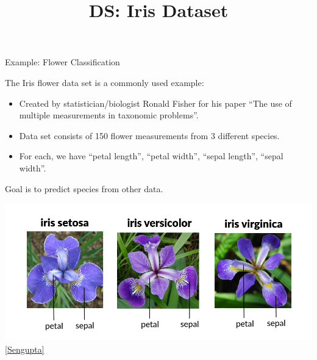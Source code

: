 \documentclass[aspectratio=169]{../latex_main/tntbeamer}  %
\title[Introduction]{DS: Iris Dataset}
\subtitle{}
\begin{document}
	
	\maketitle

	
	
	\begin{frame}{Example: Flower Classification}
	
	\vspace{-2em}
	    The Iris flower data set is a commonly used example:
	    \begin{itemize}
	        \item Created by statistician/biologist Ronald Fisher for his paper “The use of multiple measurements in taxonomic problems”.
	        \item Data set consists of 150 flower measurements from 3 different species.
	        \item For each, we have “petal length”, “petal width”, “sepal length”, “sepal width”.
	    \end{itemize}
	    Goal is to predict species from other data.

	        \centering
	        \includegraphics[scale=.24]{iris}
        \footnotesize \href{https://medium.com/codex/iris-101-dataset-acquisition-and-understanding-73e8b271704c}{[Sengupta]}

	\end{frame}
\end{document}

